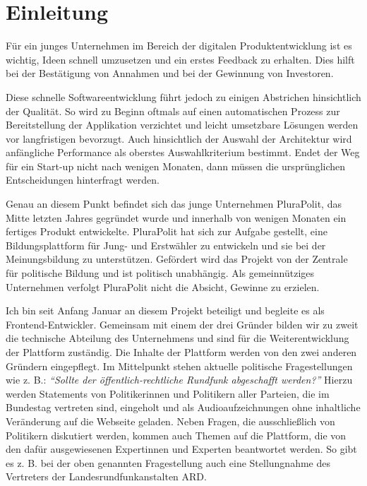 \section{Einleitung}

Für ein junges Unternehmen im Bereich der digitalen Produktentwicklung ist es wichtig, Ideen schnell umzusetzen und ein erstes Feedback zu erhalten. Dies hilft bei der Bestätigung von Annahmen und bei der Gewinnung von Investoren.

Diese schnelle Softwareentwicklung führt jedoch zu einigen Abstrichen hinsichtlich der Qualität. So wird zu Beginn oftmals auf einen automatischen Prozess zur Bereitstellung der Applikation verzichtet und leicht umsetzbare Lösungen werden vor langfristigen bevorzugt. Auch hinsichtlich der Auswahl der Architektur wird anfängliche Performance als oberstes Auswahlkriterium bestimmt. Endet der Weg für ein Start-up nicht nach wenigen Monaten, dann müssen die ursprünglichen Entscheidungen hinterfragt werden.

Genau an diesem Punkt befindet sich das junge Unternehmen PluraPolit, das Mitte letzten Jahres gegründet wurde und innerhalb von wenigen Monaten ein fertiges Produkt entwickelte. PluraPolit hat sich zur Aufgabe gestellt, eine Bildungsplattform für Jung- und Erstwähler zu entwickeln und sie bei der Meinungsbildung zu unterstützen. Gefördert wird das Projekt von der Zentrale für politische Bildung und ist politisch unabhängig. Als gemeinnütziges Unternehmen verfolgt PluraPolit nicht die Absicht, Gewinne zu erzielen.

Ich bin seit Anfang Januar an diesem Projekt beteiligt und begleite es als Frontend-Entwickler. Gemeinsam mit einem der drei Gründer bilden wir zu zweit die technische Abteilung des Unternehmens und sind für die Weiterentwicklung der Plattform zuständig. Die Inhalte der Plattform werden von den zwei anderen Gründern eingepflegt. Im Mittelpunkt stehen aktuelle politische Fragestellungen wie z. B.: \textit{\enquote{Sollte der öffentlich-rechtliche Rundfunk abgeschafft werden?}} Hierzu werden Statements von Politikerinnen und Politikern aller Parteien, die im Bundestag vertreten sind, eingeholt und als Audioaufzeichnungen ohne inhaltliche Veränderung auf die Webseite geladen. Neben Fragen, die ausschließlich von Politikern diskutiert werden, kommen auch Themen auf die Plattform, die von den dafür ausgewiesenen Expertinnen und Experten beantwortet werden. So gibt es z. B. bei der oben genannten Fragestellung auch eine Stellungnahme des Vertreters der Landesrundfunkanstalten ARD. 

